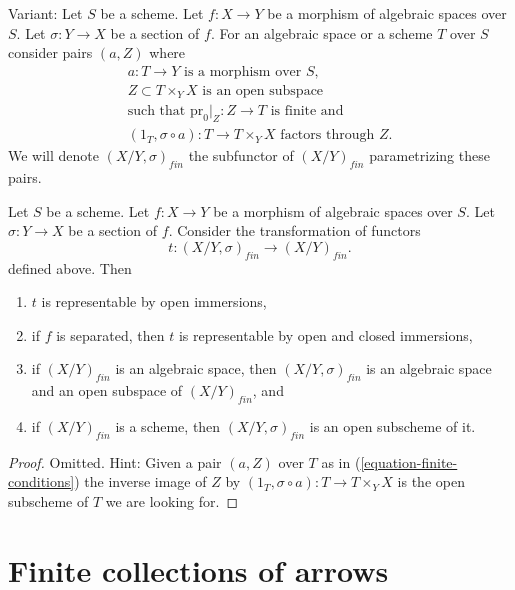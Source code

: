 \noindent
Variant: Let $S$ be a scheme.
Let $f : X \to Y$ be a morphism of algebraic spaces over $S$.
Let $\sigma : Y \to X$ be a section of $f$.
For an algebraic space or a scheme $T$ over $S$ consider pairs
$(a, Z)$ where
\begin{equation}
\label{equation-finite-conditions-variant}
\begin{matrix}
a : T \to Y\text{ is a morphism over }S, \\
Z \subset T \times_Y X\text{ is an open subspace} \\
\text{such that }\text{pr}_0|_Z : Z \to T\text{ is finite and} \\
(1_T, \sigma \circ a) : T \to T \times_Y X\text{ factors through }Z.
\end{matrix}
\end{equation}
We will denote $(X/Y, \sigma)_{fin}$ the subfunctor of $(X/Y)_{fin}$
parametrizing these pairs.

\begin{lemma}
\label{lemma-finite-plus-section}
Let $S$ be a scheme.
Let $f : X \to Y$ be a morphism of algebraic spaces over $S$.
Let $\sigma : Y \to X$ be a section of $f$. Consider the
transformation of functors
$$
t : (X/Y, \sigma)_{fin} \longrightarrow (X/Y)_{fin}.
$$
defined above. Then
\begin{enumerate}
\item $t$ is representable by open immersions,
\item if $f$ is separated, then $t$ is representable by open
and closed immersions,
\item if $(X/Y)_{fin}$ is an algebraic space, then
$(X/Y, \sigma)_{fin}$ is an algebraic space and
an open subspace of $(X/Y)_{fin}$, and
\item if $(X/Y)_{fin}$ is a scheme, then $(X/Y, \sigma)_{fin}$ is an
open subscheme of it.
\end{enumerate}
\end{lemma}

\begin{proof}
Omitted. Hint: Given a pair $(a, Z)$ over $T$ as in
(\ref{equation-finite-conditions}) the inverse image of
$Z$ by $(1_T, \sigma \circ a) : T \to T \times_Y X$ is the open
subscheme of $T$ we are looking for.
\end{proof}





\section{Finite collections of arrows}
\label{section-finite-set-arrows}

